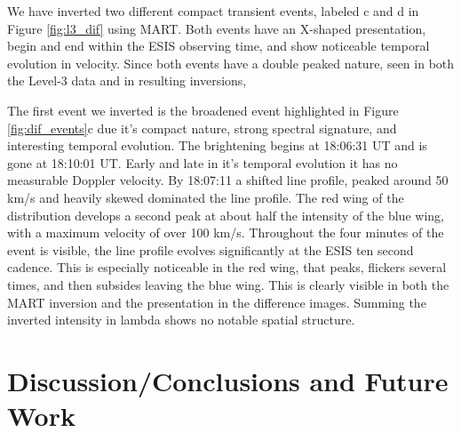 {    	\begin{figure}[htb!]
    		\centering
    		\caption{}
    		\label{fig:perfect_x_inverted}
    	\end{figure}
    	
    	We have inverted two different compact transient events, labeled c and d in Figure \ref{fig:l3_dif} using MART.
    	Both events have an X-shaped presentation, begin and end within the ESIS observing time, and show noticeable temporal evolution in velocity.
    	Since both events have a double peaked nature, seen in both the Level-3 data and in resulting inversions, 
    	
    	The first event we inverted is the broadened event highlighted in Figure \ref{fig:dif_events}c due it's compact nature, strong spectral signature, and interesting temporal evolution.
    	The brightening begins at 18:06:31 UT and is gone at 18:10:01 UT.
    	Early and late in it's temporal evolution it has no measurable Doppler velocity.
    	By 18:07:11 a shifted line profile, peaked around 50 km/s and heavily skewed dominated the line profile. 
    	The red wing of the distribution develops a second peak at about half the intensity of the blue wing, with a maximum velocity of over 100 km/s.
    	Throughout the four minutes of the event is visible, the line profile evolves significantly at the ESIS ten second cadence.
    	This is especially noticeable in the red wing, that peaks, flickers several times, and then subsides leaving the blue wing.
    	This is clearly visible in both the MART inversion and the presentation in the difference images.
    	Summing the inverted intensity in lambda shows no notable spatial structure.
    	
    	
    	

    	
    	
    	
    	
    	
    	
    	
    	
    			
    		   	
    	
\section{Discussion/Conclusions and Future Work}





\appendix
}
